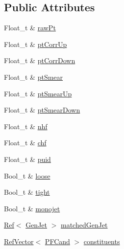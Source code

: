 \subsection*{Public Attributes}
\begin{DoxyCompactItemize}
\item 
Float\_\-t \& \hyperlink{classpanda_1_1Jet_a59f4da3420588118f746e818ab87bfc7}{rawPt}
\item 
Float\_\-t \& \hyperlink{classpanda_1_1Jet_aa15d4636fe719bd4ed4377fbbbe605cc}{ptCorrUp}
\item 
Float\_\-t \& \hyperlink{classpanda_1_1Jet_ab2d025d3feed165d8a6fce0caca65d99}{ptCorrDown}
\item 
Float\_\-t \& \hyperlink{classpanda_1_1Jet_a72556d0edd88aa288f6c54e61cc7a916}{ptSmear}
\item 
Float\_\-t \& \hyperlink{classpanda_1_1Jet_afe385d15e79676727055af154b8f9812}{ptSmearUp}
\item 
Float\_\-t \& \hyperlink{classpanda_1_1Jet_a9dbef9ad5889dd259c87abef13b992fb}{ptSmearDown}
\item 
Float\_\-t \& \hyperlink{classpanda_1_1Jet_a3d98f3183fd84146588de59effd2d953}{nhf}
\item 
Float\_\-t \& \hyperlink{classpanda_1_1Jet_a5992d4f72161327826d8964f821d73c1}{chf}
\item 
Float\_\-t \& \hyperlink{classpanda_1_1Jet_acb4eb662e6590159d1605dfe85aca50a}{puid}
\item 
Bool\_\-t \& \hyperlink{classpanda_1_1Jet_a30b310e2462a14c5c61ab8ce42a4bbbe}{loose}
\item 
Bool\_\-t \& \hyperlink{classpanda_1_1Jet_a4bf0a3b4e1983ad5a1e0a4d63d745896}{tight}
\item 
Bool\_\-t \& \hyperlink{classpanda_1_1Jet_af46ae28622a72d41a644b5fa57164e98}{monojet}
\item 
\hyperlink{classpanda_1_1Ref}{Ref}$<$ \hyperlink{classpanda_1_1GenJet}{GenJet} $>$ \hyperlink{classpanda_1_1Jet_a793b39f86d443e064ed6b347a7e179e5}{matchedGenJet}
\item 
\hyperlink{classpanda_1_1RefVector}{RefVector}$<$ \hyperlink{classpanda_1_1PFCand}{PFCand} $>$ \hyperlink{classpanda_1_1Jet_a2a5f720652ecdc5eac264d4348bbc260}{constituents}
\end{DoxyCompactItemize}
